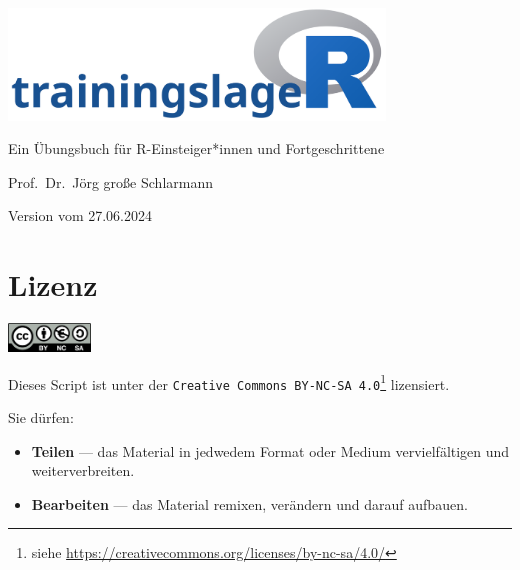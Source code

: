 \documentclass[
  11pt,
  a4paperpaper,
]{scrreprt}
\providecommand{\tightlist}{%
  \setlength{\itemsep}{0pt}\setlength{\parskip}{0pt}}\usepackage{longtable,booktabs,array}
\begin{document}
\begin{titlepage}

  \begin{center}
  \includegraphics[width=100mm]{images/trainingslageR_white.png}

  \vspace{10mm}
  \begin{minipage}[]{0.85\textwidth}
    \begin{center}
      {\color{HSNRblue1}
      \Huge Ein Übungsbuch für R-Einsteiger*innen und Fortgeschrittene
      }
    \end{center}
  \end{minipage}

  \vspace{6mm}

  \normalsize Prof.~Dr.~Jörg große Schlarmann

  \vfill
  \footnotesize Version vom 27.06.2024
  \end{center}

\thispagestyle{empty}
\end{titlepage}


\chapter*{Lizenz}\label{lizenz}


\includegraphics[width=2.2cm,height=\textheight]{_extensions/buechlein/ccbyncsa.png}

Dieses Script ist unter der
\texttt{Creative\ Commons\ BY-NC-SA\ 4.0}\footnote{siehe
  \url{https://creativecommons.org/licenses/by-nc-sa/4.0/}} lizensiert.

Sie dürfen:

\begin{itemize}
\tightlist
\item
  \textbf{Teilen} --- das Material in jedwedem Format oder Medium
  vervielfältigen und weiterverbreiten.
\item
  \textbf{Bearbeiten} --- das Material remixen, verändern und darauf
  aufbauen.
\end{itemize}
\end{document}
